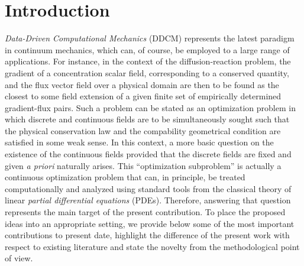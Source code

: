 \section{Introduction}

\textit{Data-Driven Computational Mechanics} (DDCM) represents the latest paradigm in continuum mechanics, which can, of course, be employed to a large range of applications. For instance, in the context of the diffusion-reaction problem, the gradient of a concentration scalar field, corresponding to a conserved quantity, and the flux vector field over a physical domain are then to be found as the closest to some field extension of a given finite set of empirically determined gradient-flux pairs. Such a problem can be stated as an optimization problem in which discrete and continuous fields are to be simultaneously sought such that the physical conservation law and the compability geometrical condition are satisfied in some weak sense. In this context, a more basic question on the existence of the continuous fields provided that the discrete fields are fixed and given \textit{a priori} naturally arises. This ``optimization subproblem'' is actually a continuous optimization problem that can, in principle, be treated computationally and analyzed using standard tools from the classical theory of linear \textit{partial differential equations} (PDEs). Therefore, answering that question represents the main target of the present contribution. To place the proposed ideas into an appropriate setting, we provide below some of the most important contributions to present date, highlight the difference of the present work with respect to existing literature and state the novelty from the methodological point of view.

